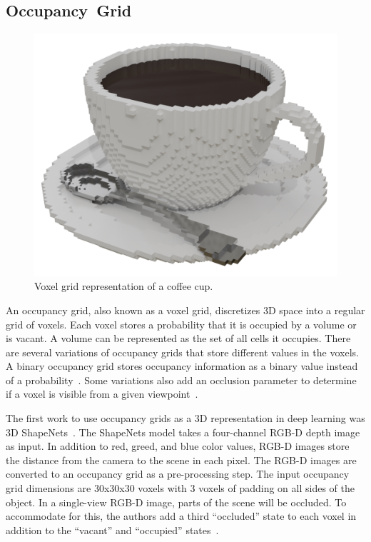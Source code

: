 \subsection{Occupancy~Grid}
\label{subsec:occupancy_grid}

\begin{figure}[h]
	\centering
	\includegraphics[scale=0.2]{Images/Voxel Cup}
	\caption{Voxel grid representation of a coffee cup.}
	\label{fig:voxel_cup}
\end{figure}

An occupancy grid, also known as a voxel grid, discretizes 3D space into a regular grid of voxels. Each voxel stores a probability that it is occupied by a volume or is vacant. A volume can be represented as the set of all cells it occupies. There are several variations of occupancy grids that store different values in the voxels. A binary occupancy grid stores occupancy information as a binary value instead of a probability~\cite{Konolige1997}. Some variations also add an occlusion parameter to determine if a voxel is visible from a given viewpoint~\cite{Xiao2020}.

The first work to use occupancy grids as a 3D representation in deep learning was 3D ShapeNets~\cite{Wu2015}. The ShapeNets model takes a four-channel RGB-D depth image as input. In addition to red, greed, and blue color values, RGB-D images store the distance from the camera to the scene in each pixel. The RGB-D images are converted to an occupancy grid as a pre-processing step. The input occupancy grid dimensions are 30x30x30 voxels with 3 voxels of padding on all sides of the object. In a single-view RGB-D image, parts of the scene will be occluded. To accommodate for this, the authors add a third ``occluded'' state to each voxel in addition to the ``vacant'' and ``occupied'' states~\cite{Wu2015}.


